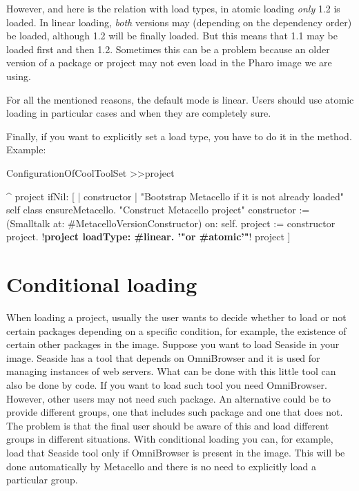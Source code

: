 \documentclass[a4paper,10pt,twoside]{book}
\begin{document}
However, and here is the relation with load types, in atomic loading \emph{only} 1.2 is loaded. In linear loading, \emph{both} versions may (depending on the dependency order) be loaded, although 1.2 will be finally loaded. But this means that 1.1 may be loaded first and then 1.2. Sometimes this can be a problem because an older version of a package or project may not even load in the Pharo image we are using. 

For all the mentioned reasons, the default mode is linear. Users should use atomic loading in particular cases and when they are completely sure. 

Finally, if you want to explicitly set a load type, you have to do it in the  method. Example:

\begin{code}{}
ConfigurationOfCoolToolSet >>project

       ^ project ifNil: [ | constructor |
              "Bootstrap Metacello if it is not already loaded"
              self class ensureMetacello.
              "Construct Metacello project"
              constructor := (Smalltalk at: #MetacelloVersionConstructor) on: self.
              project := constructor project.
              !\textbf{project loadType: \#linear. '"or \#atomic'"}!
              project ]

\end{code}


\section{Conditional loading}
When loading a project, usually the user wants to decide whether to load or not certain packages depending on a specific condition, for example, the existence of certain other packages in the image. Suppose you want to load Seaside in your image. Seaside has a tool that depends on OmniBrowser and it is used for managing instances of web servers. What can be done with this little tool can also be done by code. If you want to load such tool you need OmniBrowser. However, other users may not need such package. An alternative could be to provide different groups, one that includes such package and one that does not. The problem is that the final user should be aware of this and load different groups in different situations.  With conditional loading you can, for example, load that Seaside tool only if OmniBrowser is present in the image. This will be done automatically by Metacello and there is no need to explicitly load a particular group. 
\end{document}
